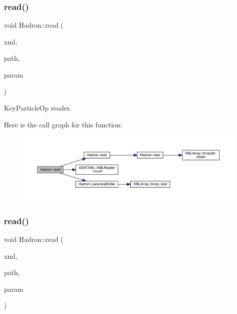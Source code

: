 \subsubsection{\texorpdfstring{read()}{read()}\hspace{0.1cm}{\footnotesize\ttfamily [17/94]}}
{\footnotesize\ttfamily void Hadron\+::read (\begin{DoxyParamCaption}\item[{\mbox{\hyperlink{classADATXML_1_1XMLReader}{X\+M\+L\+Reader}} \&}]{xml,  }\item[{const std\+::string \&}]{path,  }\item[{\mbox{\hyperlink{structHadron_1_1KeyParticleOp__t}{Key\+Particle\+Op\+\_\+t}} \&}]{param }\end{DoxyParamCaption})}



Key\+Particle\+Op reader. 

Here is the call graph for this function\+:
\nopagebreak
\begin{figure}[H]
\begin{center}
\leavevmode
\includegraphics[width=350pt]{d1/daf/namespaceHadron_aa490647cc42691054f51d9885e6ec91c_cgraph}
\end{center}
\end{figure}
\mbox{\label{namespaceHadron_ad46ef728c9d609cbf63217c66bdf0285}} 
\subsubsection{\texorpdfstring{read()}{read()}\hspace{0.1cm}{\footnotesize\ttfamily [18/94]}}
{\footnotesize\ttfamily void Hadron\+::read (\begin{DoxyParamCaption}\item[{\mbox{\hyperlink{classADATXML_1_1XMLReader}{X\+M\+L\+Reader}} \&}]{xml,  }\item[{const std\+::string \&}]{path,  }\item[{\mbox{\hyperlink{structHadron_1_1MatrixSpinRep__t}{Matrix\+Spin\+Rep\+\_\+t}} \&}]{param }\end{DoxyParamCaption})}



